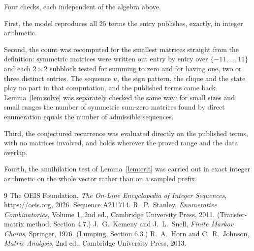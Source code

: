 \documentclass[11pt,a4paper]{article}
\theoremstyle{plain}
\theoremstyle{definition}
\begin{document}
Four checks, each independent of the algebra above.

First, the model reproduces all $25$ terms the entry publishes, exactly, in integer
arithmetic.

Second, the count was recomputed for the smallest matrices straight from the definition:
symmetric matrices were written out entry by entry over $\{-11,\dots,11\}$ and each
$2\times2$ subblock tested for summing to zero and for having one, two or three distinct entries. The
sequence $u$, the sign pattern, the clique and the state play no part in that computation, and
the published terms came back. Lemma~\ref{lem:solve} was separately checked the same way: for
small sizes and small ranges the number of symmetric sum-zero matrices found by direct
enumeration equals the number of admissible sequences.

Third, the conjectured recurrence was evaluated directly on the published terms, with no
matrices involved, and holds wherever the proved range and the data overlap.

Fourth, the annihilation test of Lemma~\ref{lem:crit} was carried out in exact integer
arithmetic on the whole vector rather than on a sampled prefix.

\begin{thebibliography}{9}
 The OEIS Foundation, \emph{The On-Line Encyclopedia of Integer
Sequences}, \url{https://oeis.org}, 2026. Sequence A211714.
 R.~P.~Stanley, \emph{Enumerative Combinatorics}, Volume 1, 2nd ed.,
Cambridge University Press, 2011. (Transfer-matrix method, Section 4.7.)
 J.~G.~Kemeny and J.~L.~Snell, \emph{Finite Markov Chains}, Springer, 1976.
(Lumping, Section 6.3.)
 R.~A.~Horn and C.~R.~Johnson, \emph{Matrix Analysis}, 2nd ed., Cambridge
University Press, 2013.
\end{thebibliography}
\end{document}
